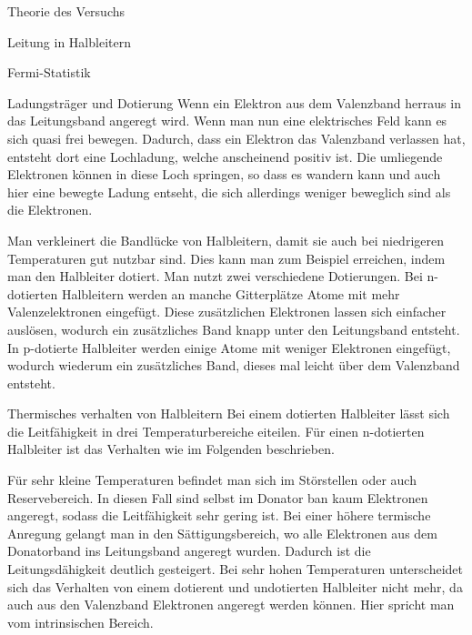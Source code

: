 \documentclass[pdftex, a4paper,11pt, twoside, ngerman]{report}
\begin{document}
\begin{chapter}{Theorie des Versuchs}
\begin{section}{Leitung in Halbleitern}
\begin{subsection}{Fermi-Statistik}
        \end{subsection}

        \begin{subsection}{Ladungsträger und Dotierung}
            Wenn ein Elektron aus dem Valenzband herraus in das Leitungsband angeregt wird.
            Wenn man nun eine elektrisches Feld kann es sich quasi frei bewegen.
            Dadurch, dass ein Elektron das Valenzband verlassen hat, entsteht dort eine Lochladung, welche anscheinend positiv ist. 
            Die umliegende Elektronen können in diese Loch springen, so dass es wandern kann und auch hier eine bewegte Ladung entseht, die sich allerdings weniger beweglich sind als die Elektronen.

            Man verkleinert die Bandlücke von Halbleitern, damit sie auch bei niedrigeren Temperaturen gut nutzbar sind.
            Dies kann man zum Beispiel erreichen, indem man den Halbleiter dotiert.
            Man nutzt zwei verschiedene Dotierungen. 
            Bei n-dotierten Halbleitern werden an manche Gitterplätze Atome mit mehr Valenzelektronen eingefügt.
            Diese zusätzlichen Elektronen lassen sich einfacher auslösen, wodurch ein zusätzliches Band knapp unter den Leitungsband entsteht.
            In p-dotierte Halbleiter werden einige Atome mit weniger Elektronen eingefügt, wodurch wiederum ein zusätzliches Band, dieses mal leicht über dem Valenzband entsteht.

        \end{subsection}

        \begin{subsection}{Thermisches verhalten von Halbleitern}
            Bei einem dotierten Halbleiter lässt sich die Leitfähigkeit in drei Temperaturbereiche eiteilen.
            Für einen n-dotierten Halbleiter ist das Verhalten wie im Folgenden beschrieben.

            Für sehr kleine Temperaturen befindet man sich im Störstellen oder auch Reservebereich. In diesen Fall sind selbst im Donator ban kaum Elektronen angeregt, sodass die Leitfähigkeit sehr gering ist.
            Bei einer höhere termische Anregung gelangt man in den Sättigungsbereich, wo alle Elektronen aus dem Donatorband ins Leitungsband angeregt wurden.
            Dadurch ist die Leitungsdähigkeit deutlich gesteigert.
            Bei sehr hohen Temperaturen unterscheidet sich das Verhalten von einem dotierent und undotierten Halbleiter nicht mehr, da auch aus den Valenzband Elektronen angeregt werden können.
            Hier spricht man vom intrinsischen Bereich.


\end{subsection}
\end{section}
\end{chapter}
\end{document}
